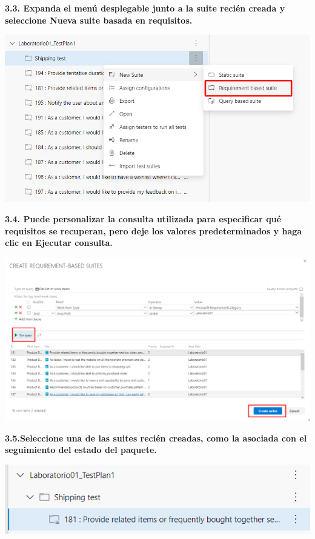 \documentclass{article}
\begin{document}
\textbf{3.3. Expanda el menú desplegable junto a la suite recién creada y seleccione Nueva suite basada en requisitos.}

    \begin{center}
		\includegraphics[width=14cm]{./images/3.3} 
	\end{center}
		
\newpage
\textbf{3.4. 
Puede personalizar la consulta utilizada para especificar qué requisitos se recuperan, pero deje los valores predeterminados y haga clic en Ejecutar consulta. }

    \begin{center}
		\includegraphics[width=14cm]{./images/3.4} 
	\end{center}
		
\textbf{3.5.Seleccione una de las suites recién creadas, como la asociada con el seguimiento del estado del paquete.}

    \begin{center}
		\includegraphics[width=14cm]{./images/3.5} 
	\end{center}
		
\end{document}
